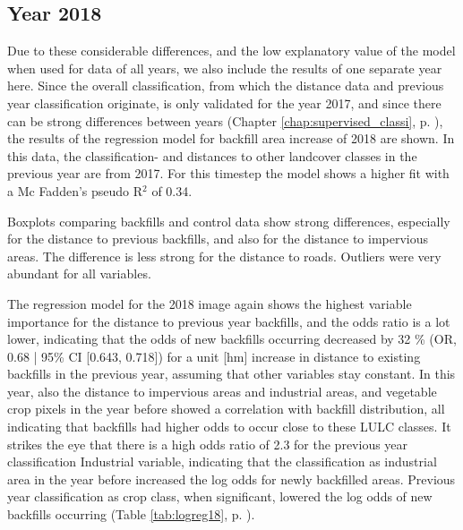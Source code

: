 \documentclass[11pt, A4, oneside]{report}
\begin{document}
\subsection{Year 2018}
Due to these considerable differences, and the low explanatory value of the model when used for data of all years, we also include the results of one separate year here. Since the overall classification, from which the distance data and previous year classification originate, is only validated for the year 2017, and since there can be strong differences between years (Chapter \ref{chap:supervised_classi}, p. \pageref{chap:supervised_classi}), the results of the regression model for backfill area increase of 2018 are shown. In this data, the classification- and distances to other landcover classes in the previous year are from 2017. For this timestep the model shows a higher fit with a Mc Fadden's pseudo R$^2$ of 0.34.

Boxplots comparing backfills and control data show strong differences, especially for the distance to previous backfills, and also for the distance to impervious areas. The difference is less strong for the distance to roads. Outliers were very abundant for all variables.

The regression model for the 2018 image again shows the highest variable importance for the distance to previous year backfills, and the odds ratio is a lot lower, indicating that the odds of new backfills occurring decreased by 32 \% (OR, 0.68 | 95\% CI [0.643, 0.718]) for a unit [hm] increase in distance to existing backfills in the previous year, assuming that other variables stay constant. In this year, also the distance to impervious areas and industrial areas, and vegetable crop pixels in the year before showed a correlation with backfill distribution, all indicating that backfills had higher odds to occur close to these LULC classes. It strikes the eye that there is a high odds ratio of 2.3 for the previous year classification Industrial variable, indicating that the classification as industrial area in the year before increased the log odds for newly backfilled areas. Previous year classification as crop class, when significant, lowered the log odds of new backfills occurring (Table \ref{tab:logreg18}, p. \pageref{tab:logreg18}).
\end{document}
